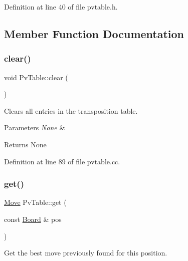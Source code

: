 Definition at line 40 of file pvtable.\+h.



\subsection{Member Function Documentation}
\mbox{\label{classPvTable_a96b49a337793b2dc29d7f049ae54091f}} 
\subsubsection{\texorpdfstring{clear()}{clear()}}
{\footnotesize\ttfamily void Pv\+Table\+::clear (\begin{DoxyParamCaption}{ }\end{DoxyParamCaption})\hspace{0.3cm}{\ttfamily [noexcept]}}



Clears all entries in the transposition table. 


\begin{DoxyParams}{Parameters}
{\em None} & \\
\hline
\end{DoxyParams}
\begin{DoxyReturn}{Returns}
None 
\end{DoxyReturn}


Definition at line 89 of file pvtable.\+cc.

\mbox{\label{classPvTable_affc22eb520f1e4c8fc30366e38af5868}} 
\subsubsection{\texorpdfstring{get()}{get()}}
{\footnotesize\ttfamily \mbox{\hyperlink{classMove}{Move}} Pv\+Table\+::get (\begin{DoxyParamCaption}\item[{const \mbox{\hyperlink{classBoard}{Board}} \&}]{pos }\end{DoxyParamCaption})\hspace{0.3cm}{\ttfamily [noexcept]}}



Get the best move previously found for this position. 


